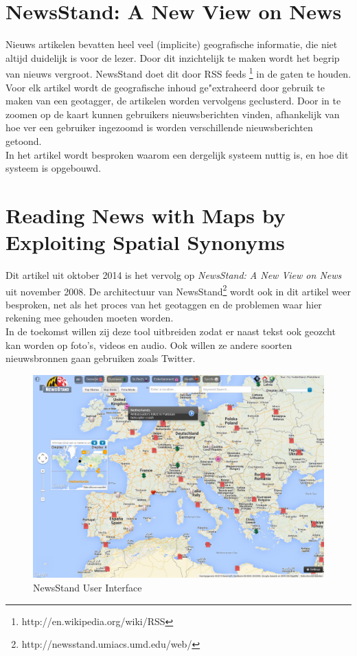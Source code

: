 \documentclass[twoside,openright]{uva-bachelor-thesis}
\begin{document}
	\section{NewsStand: A New View on News \cite{NewsStand2008}}
		Nieuws artikelen bevatten heel veel (implicite) geografische informatie, die niet altijd duidelijk is voor de lezer. Door dit inzichtelijk te maken wordt het begrip van nieuws vergroot. NewsStand doet dit door RSS feeds \footnote{http://en.wikipedia.org/wiki/RSS} in de gaten te houden. Voor elk artikel wordt de geografische inhoud ge"extraheerd door gebruik te maken van een geotagger, de artikelen worden vervolgens geclusterd. Door in te zoomen op de kaart kunnen gebruikers nieuwsberichten vinden, afhankelijk van hoe ver een gebruiker ingezoomd is worden verschillende nieuwsberichten getoond.
		\\[0.5cm]
		In het artikel wordt besproken waarom een dergelijk systeem nuttig is, en hoe dit systeem is opgebouwd.
	\section{Reading News with Maps by Exploiting Spatial Synonyms \cite{RNwMbESS}}
		Dit artikel uit oktober 2014 is het vervolg op \textit{NewsStand: A New View on News} uit november 2008. De architectuur van NewsStand\footnote{http://newsstand.umiacs.umd.edu/web/} wordt ook in dit artikel weer besproken, net als het proces van het geotaggen en de problemen waar hier rekening mee gehouden moeten worden.
		\\[0.5cm]
		In de toekomst willen zij deze tool uitbreiden zodat er naast tekst ook geozcht kan worden op foto's, videos en audio. Ook willen ze andere soorten nieuwsbronnen gaan gebruiken zoals Twitter.
		\begin{figure}[!htb]
			\centering
			\includegraphics[scale=0.3]{./img/NewsStand.png}
			\caption{NewsStand User Interface}
		\end{figure}
\end{document}
